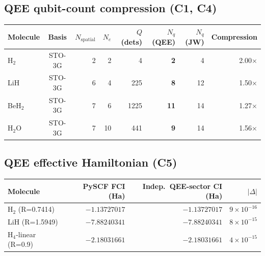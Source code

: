 \documentclass[11pt]{article}
\begin{document}
\subsection*{QEE qubit-count compression (C1, C4)}
\begin{tabular}{lcrrrrrr}
\toprule
Molecule & Basis & $N_{\text{spatial}}$ & $N_e$ & $Q$ (dets) & $N_q$(QEE) & $N_q$(JW) & Compression \\
\midrule
H$_2$    & STO-3G & 2 &  2 &    4 &  \textbf{2} &  4 & 2.00$\times$ \\
LiH      & STO-3G & 6 &  4 &  225 &  \textbf{8} & 12 & 1.50$\times$ \\
BeH$_2$  & STO-3G & 7 &  6 & 1225 & \textbf{11} & 14 & 1.27$\times$ \\
H$_2$O   & STO-3G & 7 & 10 &  441 &  \textbf{9} & 14 & 1.56$\times$ \\
\bottomrule
\end{tabular}

\subsection*{QEE effective Hamiltonian (C5)}
\begin{tabular}{lrrr}
\toprule
Molecule & PySCF FCI (Ha) & Indep.\ QEE-sector CI (Ha) & $|\Delta|$ \\
\midrule
H$_2$ (R=0.7414)       & $-1.13727017$ & $-1.13727017$ & $9\times10^{-16}$ \\
LiH (R=1.5949)         & $-7.88240341$ & $-7.88240341$ & $8\times10^{-15}$ \\
H$_4$-linear (R=0.9)   & $-2.18031661$ & $-2.18031661$ & $4\times10^{-15}$ \\
\bottomrule
\end{tabular}
\end{document}
